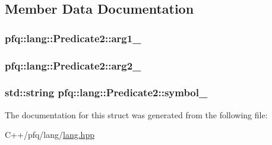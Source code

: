 \subsection{Member Data Documentation}
\hypertarget{structpfq_1_1lang_1_1Predicate2_a9d1bc0663b638551913871c35a7706a7}{
\subsubsection[{arg1\+\_\+}]{ pfq\+::lang\+::\+Predicate2\+::arg1\+\_\+}}\label{structpfq_1_1lang_1_1Predicate2_a9d1bc0663b638551913871c35a7706a7}
\hypertarget{structpfq_1_1lang_1_1Predicate2_aa25ff9d4aa934222dd808efd7320922c}{
\subsubsection[{arg2\+\_\+}]{ pfq\+::lang\+::\+Predicate2\+::arg2\+\_\+}}\label{structpfq_1_1lang_1_1Predicate2_aa25ff9d4aa934222dd808efd7320922c}
\hypertarget{structpfq_1_1lang_1_1Predicate2_ae6a811624aaa1b8ddc5998b42bab8618}{
\subsubsection[{symbol\+\_\+}]{\setlength{\rightskip}{0pt plus 5cm}std\+::string pfq\+::lang\+::\+Predicate2\+::symbol\+\_\+}}\label{structpfq_1_1lang_1_1Predicate2_ae6a811624aaa1b8ddc5998b42bab8618}


The documentation for this struct was generated from the following file\+:\begin{DoxyCompactItemize}
\item 
C++/pfq/lang/\hyperlink{lang_8hpp}{lang.\+hpp}\end{DoxyCompactItemize}
